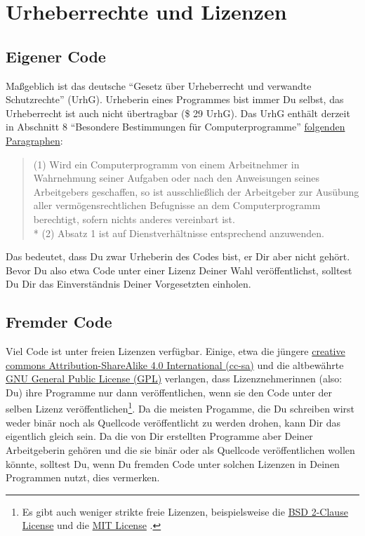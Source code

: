 \documentclass[twoside]{scrreprt}
\begin{document}
\section{Urheberrechte und Lizenzen}
\subsection{Eigener Code}
Ma\ss{}geblich ist das deutsche "`Gesetz \"u{}ber Urheberrecht und verwandte
Schutzrechte"' (UrhG).
Urheberin eines Programmes bist immer Du selbst, das Urheberrecht ist auch nicht
\"u{}bertragbar (\$ 29 UrhG).
Das UrhG enth\"a{}lt derzeit in Abschnitt 8 "`Besondere Bestimmungen f\"u{}r
Computerprogramme"' 
\href{http://www.gesetze-im-internet.de/urhg/__69b.html}{folgenden Paragraphen}:
\begin{quote}
(1) Wird ein Computerprogramm von einem Arbeitnehmer in Wahrnehmung seiner
Aufgaben oder nach den Anweisungen seines Arbeitgebers geschaffen, so ist
ausschlie\ss{}lich der Arbeitgeber zur Aus\"u{}bung aller
verm\"o{}gensrechtlichen Befugnisse an dem Computerprogramm berechtigt, sofern
nichts anderes vereinbart ist.\\*
(2) Absatz 1 ist auf Dienstverh\"a{}ltnisse entsprechend anzuwenden.
  \end{quote}

Das bedeutet, dass Du zwar Urheberin des Codes bist, er Dir aber nicht
geh\"o{}rt. Bevor Du also etwa Code unter einer Lizenz Deiner Wahl
ver\"o{}ffentlichst, solltest Du Dir das Einverst\"a{}ndnis Deiner Vorgesetzten
einholen.

\subsection{Fremder Code\label{sec:copy_foreign}}
Viel Code ist unter freien Lizenzen verf\"u{}gbar. Einige, etwa die
j\"u{}ngere \linebreak{}
\href{https://creativecommons.org/licenses/by-sa/4.0/legalcode}%
{creative commons Attribution-ShareAlike 4.0 International (cc-sa)}
und die altbew\"a{}hrte
\href{http://www.gnu.org/licenses/gpl-3.0.html}%
{GNU General Public License (GPL)}
verlangen, dass Lizenznehmerinnen (also: Du) ihre Programme nur dann
ver\"o{}ffentlichen, wenn sie den Code unter der selben Lizenz
ver\"o{}ffentlichen\footnote{Es gibt auch weniger strikte freie Lizenzen,
beispielsweise die
\href{http://opensource.org/licenses/BSD-2-Clause}{BSD 2-Clause License} und
die
\href{http://opensource.org/licenses/MIT}{MIT License}%
. }.
Da die meisten Progamme, die Du schreiben wirst weder bin\"a{}r noch als
Quellcode ver\"o{}ffentlicht zu werden drohen, kann Dir das eigentlich gleich
sein.
Da die von Dir erstellten Programme aber Deiner Arbeitgeberin geh\"o{}ren und 
die sie bin\"a{}r oder als Quellcode ver\"o{}ffentlichen wollen k\"o{}nnte,
solltest Du, wenn Du fremden Code unter solchen Lizenzen in Deinen Programmen
nutzt, dies vermerken.
\end{document}
